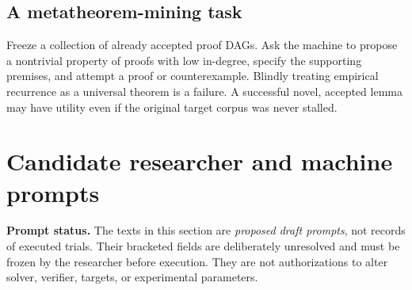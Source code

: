 \documentclass[11pt,letterpaper]{article}
\begin{document}
\subsection{A metatheorem-mining task}
Freeze a collection of already accepted proof DAGs. Ask the machine to propose a nontrivial property of proofs with low in-degree, specify the supporting premises, and attempt a proof or counterexample. Blindly treating empirical recurrence as a universal theorem is a failure. A successful novel, accepted lemma may have utility even if the original target corpus was never stalled.

\section{Candidate researcher and machine prompts}
\begin{statusbox}
\textbf{Prompt status.} The texts in this section are \emph{proposed draft prompts}, not records of executed trials. Their bracketed fields are deliberately unresolved and must be frozen by the researcher before execution. They are not authorizations to alter solver, verifier, targets, or experimental parameters.
\end{statusbox}
\end{document}
